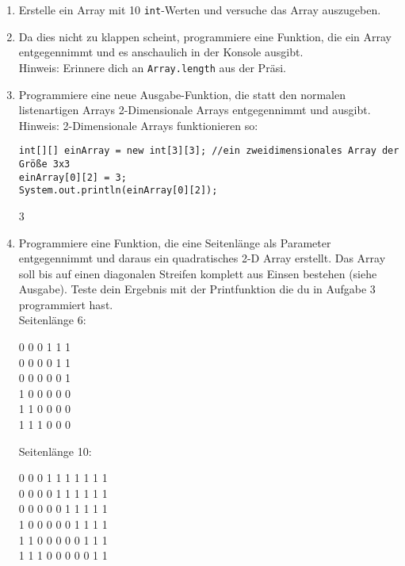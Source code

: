 \documentclass{../../sheet}
\begin{document}
\begin{enumerate}
    \item Erstelle ein Array mit 10 \texttt{int}-Werten und versuche das Array auszugeben.
    \item Da dies nicht zu klappen scheint, programmiere eine Funktion, die ein Array entgegennimmt und es anschaulich in der Konsole ausgibt.\\
          Hinweis: Erinnere dich an \texttt{Array.length} aus der Präsi.
    \item Programmiere eine neue Ausgabe-Funktion, die statt den normalen listenartigen Arrays 2-Dimensionale Arrays entgegennimmt und ausgibt.\\
    Hinweis: 2-Dimensionale Arrays funktionieren so:
    \begin{verbatim}
int[][] einArray = new int[3][3]; //ein zweidimensionales Array der Größe 3x3
einArray[0][2] = 3;
System.out.println(einArray[0][2]);
    \end{verbatim}
    \begin{ausgabe}
        3
    \end{ausgabe}
    \item Programmiere eine Funktion, die eine Seitenlänge als Parameter entgegennimmt und daraus ein quadratisches 2-D Array erstellt. Das Array soll bis auf einen diagonalen Streifen komplett aus Einsen bestehen (siehe Ausgabe). Teste dein Ergebnis mit der Printfunktion die du in Aufgabe 3 programmiert hast.\\
          Seitenlänge 6:
          \begin{ausgabe}
              0 0 0 1 1 1\\
              0 0 0 0 1 1\\
              0 0 0 0 0 1\\
              1 0 0 0 0 0\\
              1 1 0 0 0 0\\
              1 1 1 0 0 0
          \end{ausgabe}
          Seitenlänge 10:
          \begin{ausgabe}
              0 0 0 1 1 1 1 1 1 1 \\
              0 0 0 0 1 1 1 1 1 1 \\
              0 0 0 0 0 1 1 1 1 1 \\
              1 0 0 0 0 0 1 1 1 1 \\
              1 1 0 0 0 0 0 1 1 1 \\
              1 1 1 0 0 0 0 0 1 1 \\

\end{ausgabe}
\end{enumerate}
\end{document}
